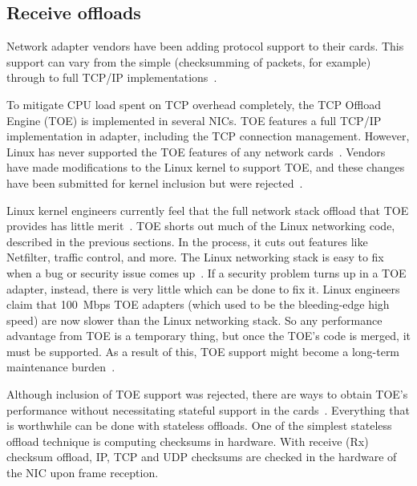 
\subsection{Receive offloads}\label{subsec:linux-ingress-offloads}
Network adapter vendors have been adding protocol support to their cards.
This support can vary from the simple (checksumming of packets, for example)
through to full TCP/IP implementations~\cite{linux-and-tcp-offload-engines}.

To mitigate CPU load spent on TCP overhead completely, the TCP Offload Engine (TOE) is implemented in several NICs.
TOE features a full TCP/IP implementation in adapter, including the TCP connection management.
However, Linux has never supported the TOE features of any network cards~\cite{linux-and-tcp-offload-engines}.
Vendors have made modifications to the Linux kernel to support TOE,
and these changes have been submitted for kernel inclusion but were rejected~\cite{linux-foundation-toe}. 

Linux kernel engineers currently feel that the full network stack offload
that TOE provides has little merit~\cite{linux-foundation-toe}.
TOE shorts out much of the Linux networking code, described in the previous sections.
In the process, it cuts out features like Netfilter, traffic control, and more.
The Linux networking stack is easy to fix when a bug or security issue comes up~\cite{linux-and-tcp-offload-engines}.
If a security problem turns up in a TOE adapter, instead, there is very little which can be done to fix it.
Linux engineers claim that 100~Mbps TOE adapters
(which used to be the bleeding-edge high speed)
are now slower than the Linux networking stack.
So any performance advantage from TOE is a temporary thing, but once the TOE's code is merged, it must be supported.
As a result of this, TOE support might become a long-term maintenance burden~\cite{linux-and-tcp-offload-engines}.

Although inclusion of TOE support was rejected, there are ways to obtain TOE's performance without
necessitating stateful support in the cards~\cite{linux-and-tcp-offload-engines}.
Everything that is worthwhile can be done with stateless offloads.
One of the simplest stateless offload technique is computing checksums in hardware.
With receive (Rx) checksum offload, IP, TCP and UDP checksums are checked in the hardware of the NIC upon frame reception.

